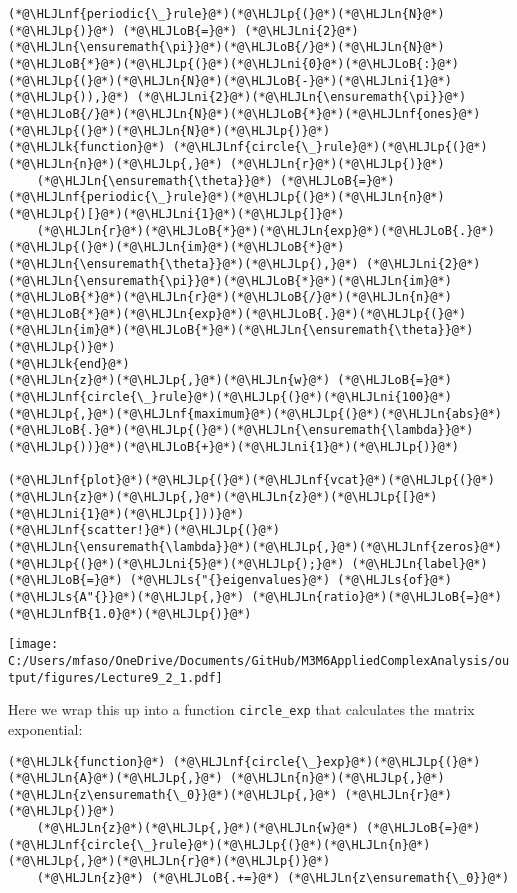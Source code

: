 \documentclass[12pt,landscape]{article}
\newcommand{\HLJLk}[1]{\textcolor[RGB]{148,91,176}{\textbf{#1}}}
\newcommand{\HLJLn}[1]{#1}
\newcommand{\HLJLnf}[1]{\textcolor[RGB]{66,102,213}{#1}}
\newcommand{\HLJLs}[1]{\textcolor[RGB]{201,61,57}{#1}}
\newcommand{\HLJLnfB}[1]{\textcolor[RGB]{59,151,46}{#1}}
\newcommand{\HLJLni}[1]{\textcolor[RGB]{59,151,46}{#1}}
\newcommand{\HLJLoB}[1]{\textcolor[RGB]{102,102,102}{\textbf{#1}}}
\newcommand{\HLJLp}[1]{#1}
\begin{document}
{\begin{lstlisting}
(*@\HLJLnf{periodic{\_}rule}@*)(*@\HLJLp{(}@*)(*@\HLJLn{N}@*)(*@\HLJLp{)}@*) (*@\HLJLoB{=}@*) (*@\HLJLni{2}@*)(*@\HLJLn{\ensuremath{\pi}}@*)(*@\HLJLoB{/}@*)(*@\HLJLn{N}@*)(*@\HLJLoB{*}@*)(*@\HLJLp{(}@*)(*@\HLJLni{0}@*)(*@\HLJLoB{:}@*)(*@\HLJLp{(}@*)(*@\HLJLn{N}@*)(*@\HLJLoB{-}@*)(*@\HLJLni{1}@*)(*@\HLJLp{)),}@*) (*@\HLJLni{2}@*)(*@\HLJLn{\ensuremath{\pi}}@*)(*@\HLJLoB{/}@*)(*@\HLJLn{N}@*)(*@\HLJLoB{*}@*)(*@\HLJLnf{ones}@*)(*@\HLJLp{(}@*)(*@\HLJLn{N}@*)(*@\HLJLp{)}@*)
(*@\HLJLk{function}@*) (*@\HLJLnf{circle{\_}rule}@*)(*@\HLJLp{(}@*)(*@\HLJLn{n}@*)(*@\HLJLp{,}@*) (*@\HLJLn{r}@*)(*@\HLJLp{)}@*)
    (*@\HLJLn{\ensuremath{\theta}}@*) (*@\HLJLoB{=}@*) (*@\HLJLnf{periodic{\_}rule}@*)(*@\HLJLp{(}@*)(*@\HLJLn{n}@*)(*@\HLJLp{)[}@*)(*@\HLJLni{1}@*)(*@\HLJLp{]}@*)
    (*@\HLJLn{r}@*)(*@\HLJLoB{*}@*)(*@\HLJLn{exp}@*)(*@\HLJLoB{.}@*)(*@\HLJLp{(}@*)(*@\HLJLn{im}@*)(*@\HLJLoB{*}@*)(*@\HLJLn{\ensuremath{\theta}}@*)(*@\HLJLp{),}@*) (*@\HLJLni{2}@*)(*@\HLJLn{\ensuremath{\pi}}@*)(*@\HLJLoB{*}@*)(*@\HLJLn{im}@*)(*@\HLJLoB{*}@*)(*@\HLJLn{r}@*)(*@\HLJLoB{/}@*)(*@\HLJLn{n}@*)(*@\HLJLoB{*}@*)(*@\HLJLn{exp}@*)(*@\HLJLoB{.}@*)(*@\HLJLp{(}@*)(*@\HLJLn{im}@*)(*@\HLJLoB{*}@*)(*@\HLJLn{\ensuremath{\theta}}@*)(*@\HLJLp{)}@*)
(*@\HLJLk{end}@*)
(*@\HLJLn{z}@*)(*@\HLJLp{,}@*)(*@\HLJLn{w}@*) (*@\HLJLoB{=}@*) (*@\HLJLnf{circle{\_}rule}@*)(*@\HLJLp{(}@*)(*@\HLJLni{100}@*)(*@\HLJLp{,}@*)(*@\HLJLnf{maximum}@*)(*@\HLJLp{(}@*)(*@\HLJLn{abs}@*)(*@\HLJLoB{.}@*)(*@\HLJLp{(}@*)(*@\HLJLn{\ensuremath{\lambda}}@*)(*@\HLJLp{))}@*)(*@\HLJLoB{+}@*)(*@\HLJLni{1}@*)(*@\HLJLp{)}@*)

(*@\HLJLnf{plot}@*)(*@\HLJLp{(}@*)(*@\HLJLnf{vcat}@*)(*@\HLJLp{(}@*)(*@\HLJLn{z}@*)(*@\HLJLp{,}@*)(*@\HLJLn{z}@*)(*@\HLJLp{[}@*)(*@\HLJLni{1}@*)(*@\HLJLp{]))}@*)
(*@\HLJLnf{scatter!}@*)(*@\HLJLp{(}@*)(*@\HLJLn{\ensuremath{\lambda}}@*)(*@\HLJLp{,}@*)(*@\HLJLnf{zeros}@*)(*@\HLJLp{(}@*)(*@\HLJLni{5}@*)(*@\HLJLp{);}@*) (*@\HLJLn{label}@*) (*@\HLJLoB{=}@*) (*@\HLJLs{"{}eigenvalues}@*) (*@\HLJLs{of}@*) (*@\HLJLs{A"{}}@*)(*@\HLJLp{,}@*) (*@\HLJLn{ratio}@*)(*@\HLJLoB{=}@*)(*@\HLJLnfB{1.0}@*)(*@\HLJLp{)}@*)
\end{lstlisting}

\texttt{[image: C:/Users/mfaso/OneDrive/Documents/GitHub/M3M6AppliedComplexAnalysis/output/figures/Lecture9\_2\_1.pdf]}

Here we wrap this up into a function \texttt{circle\_exp} that calculates the matrix exponential:


\begin{lstlisting}
(*@\HLJLk{function}@*) (*@\HLJLnf{circle{\_}exp}@*)(*@\HLJLp{(}@*)(*@\HLJLn{A}@*)(*@\HLJLp{,}@*) (*@\HLJLn{n}@*)(*@\HLJLp{,}@*) (*@\HLJLn{z\ensuremath{\_0}}@*)(*@\HLJLp{,}@*) (*@\HLJLn{r}@*)(*@\HLJLp{)}@*)
    (*@\HLJLn{z}@*)(*@\HLJLp{,}@*)(*@\HLJLn{w}@*) (*@\HLJLoB{=}@*) (*@\HLJLnf{circle{\_}rule}@*)(*@\HLJLp{(}@*)(*@\HLJLn{n}@*)(*@\HLJLp{,}@*)(*@\HLJLn{r}@*)(*@\HLJLp{)}@*)
    (*@\HLJLn{z}@*) (*@\HLJLoB{.+=}@*) (*@\HLJLn{z\ensuremath{\_0}}@*)


\end{lstlisting}}
\end{document}
